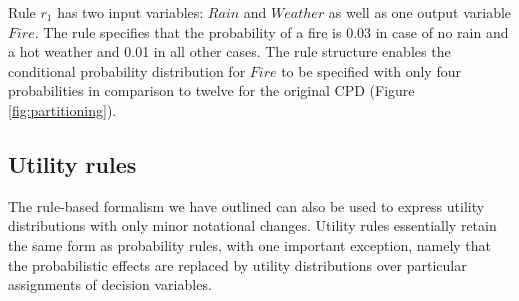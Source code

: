 Rule $r_1$ has two input variables: $\mathit{Rain}$ and $\mathit{Weather}$ as well as one output variable $\mathit{Fire}$. The rule specifies that the probability of a fire is 0.03 in case of no rain and a hot weather and 0.01 in all other cases.  The rule structure enables the conditional probability distribution for $\mathit{Fire}$ to be specified with only four probabilities in comparison to twelve for the original CPD (Figure \ref{fig:partitioning}). 


\subsection{Utility rules}

The rule-based formalism we have outlined can also be used to express utility distributions with only minor notational changes. Utility rules essentially retain the same form as probability rules, with one important exception, namely that the probabilistic effects are replaced by utility distributions over particular assignments of decision variables. 

